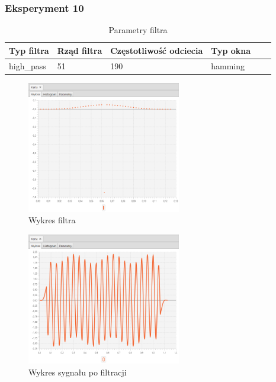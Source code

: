 \documentclass[12pt]{article}
\begin{document}
{{            \subsubsection{Eksperyment 10} {
                \begin{table}[H]
                \centering
                \begin{tabular}{|l|l|l|l|l|l|}
                \hline
                Typ filtra & Rząd filtra & Częstotliwość odciecia & Typ okna  \\\hline
                high\_pass & 51 & 190 & hamming     \\\hline
                \end{tabular}
                \caption{Parametry filtra}
                \end{table}
                \begin{figure}[H]
                \centering
                \includegraphics[width=0.6\textwidth]{img/result/filter/experiment10/data_draw_3c_filter_data_114057.png}
                \caption{Wykres filtra}
                \end{figure}

                \begin{figure}[H]
                \centering
                \includegraphics[width=0.6\textwidth]{img/result/filter/experiment10/data_draw_3c_result_reconstr_data_114200.png}
                \caption{Wykres sygnału po filtracji}
                \end{figure}
            }
            \newpage

}}
\end{document}
